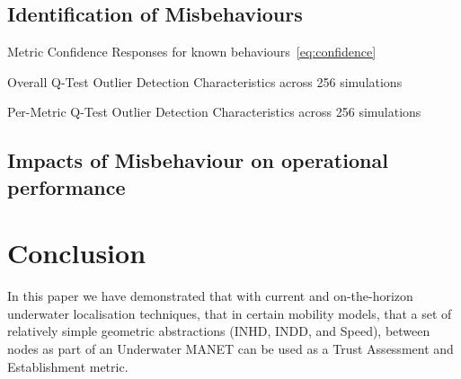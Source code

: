 \documentclass[conference]{IEEEtran}
\begin{document}
\subsection{Identification of Misbehaviours}
\begin{table}[h]
  \caption{Metric Confidence Responses for known behaviours~\eqref{eq:confidence}}
  \centering
  
  \label{tab:confidence}
\end{table}
\begin{table}
  \caption{Overall Q-Test Outlier Detection Characteristics across 256 simulations}
  \centering
  
  \label{tab:overall_stats}
\end{table}
\begin{table}
  \caption{Per-Metric Q-Test Outlier Detection Characteristics across 256 simulations}
  \centering
  
  \label{tab:per_metric_stats}
\end{table}

\subsection{Impacts of Misbehaviour on operational performance}

\section{Conclusion}
In this paper we have demonstrated that with current and on-the-horizon underwater localisation techniques, that in certain mobility models, that a set of relatively simple geometric abstractions (INHD, INDD, and Speed), between nodes as part of an Underwater MANET can be used as a Trust Assessment and Establishment metric.
\end{document}
